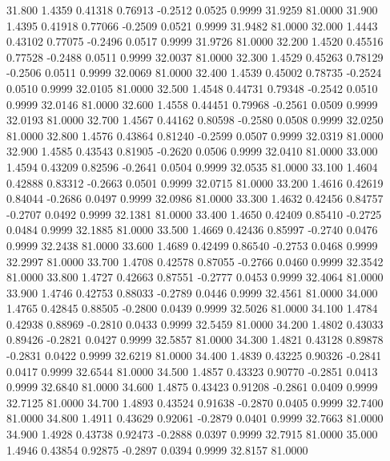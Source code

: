  31.800   1.4359   0.41318   0.76913  -0.2512   0.0525   0.9999  31.9259  81.0000
  31.900   1.4395   0.41918   0.77066  -0.2509   0.0521   0.9999  31.9482  81.0000
  32.000   1.4443   0.43102   0.77075  -0.2496   0.0517   0.9999  31.9726  81.0000
  32.200   1.4520   0.45516   0.77528  -0.2488   0.0511   0.9999  32.0037  81.0000
  32.300   1.4529   0.45263   0.78129  -0.2506   0.0511   0.9999  32.0069  81.0000
  32.400   1.4539   0.45002   0.78735  -0.2524   0.0510   0.9999  32.0105  81.0000
  32.500   1.4548   0.44731   0.79348  -0.2542   0.0510   0.9999  32.0146  81.0000
  32.600   1.4558   0.44451   0.79968  -0.2561   0.0509   0.9999  32.0193  81.0000
  32.700   1.4567   0.44162   0.80598  -0.2580   0.0508   0.9999  32.0250  81.0000
  32.800   1.4576   0.43864   0.81240  -0.2599   0.0507   0.9999  32.0319  81.0000
  32.900   1.4585   0.43543   0.81905  -0.2620   0.0506   0.9999  32.0410  81.0000
  33.000   1.4594   0.43209   0.82596  -0.2641   0.0504   0.9999  32.0535  81.0000
  33.100   1.4604   0.42888   0.83312  -0.2663   0.0501   0.9999  32.0715  81.0000
  33.200   1.4616   0.42619   0.84044  -0.2686   0.0497   0.9999  32.0986  81.0000
  33.300   1.4632   0.42456   0.84757  -0.2707   0.0492   0.9999  32.1381  81.0000
  33.400   1.4650   0.42409   0.85410  -0.2725   0.0484   0.9999  32.1885  81.0000
  33.500   1.4669   0.42436   0.85997  -0.2740   0.0476   0.9999  32.2438  81.0000
  33.600   1.4689   0.42499   0.86540  -0.2753   0.0468   0.9999  32.2997  81.0000
  33.700   1.4708   0.42578   0.87055  -0.2766   0.0460   0.9999  32.3542  81.0000
  33.800   1.4727   0.42663   0.87551  -0.2777   0.0453   0.9999  32.4064  81.0000
  33.900   1.4746   0.42753   0.88033  -0.2789   0.0446   0.9999  32.4561  81.0000
  34.000   1.4765   0.42845   0.88505  -0.2800   0.0439   0.9999  32.5026  81.0000
  34.100   1.4784   0.42938   0.88969  -0.2810   0.0433   0.9999  32.5459  81.0000
  34.200   1.4802   0.43033   0.89426  -0.2821   0.0427   0.9999  32.5857  81.0000
  34.300   1.4821   0.43128   0.89878  -0.2831   0.0422   0.9999  32.6219  81.0000
  34.400   1.4839   0.43225   0.90326  -0.2841   0.0417   0.9999  32.6544  81.0000
  34.500   1.4857   0.43323   0.90770  -0.2851   0.0413   0.9999  32.6840  81.0000
  34.600   1.4875   0.43423   0.91208  -0.2861   0.0409   0.9999  32.7125  81.0000
  34.700   1.4893   0.43524   0.91638  -0.2870   0.0405   0.9999  32.7400  81.0000
  34.800   1.4911   0.43629   0.92061  -0.2879   0.0401   0.9999  32.7663  81.0000
  34.900   1.4928   0.43738   0.92473  -0.2888   0.0397   0.9999  32.7915  81.0000
  35.000   1.4946   0.43854   0.92875  -0.2897   0.0394   0.9999  32.8157  81.0000
